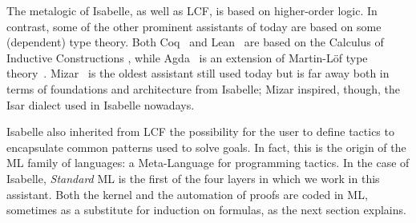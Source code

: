 The metalogic of Isabelle, as well as LCF, is based on higher-order logic.
In contrast, some of the other prominent assistants of today are
based on some (dependent) type theory. Both Coq~\cite{coq} and
Lean~\cite{DBLP:conf/cade/Moura021} are based on the Calculus of
Inductive Constructions
\cite{DBLP:conf/mfps/PfenningP89,DBLP:journals/iandc/CoquandH88},
while Agda~\cite{agda} is an extension of Martin-Löf type
theory~\cite{DBLP:books/daglib/0000395}. Mizar~\cite{mizar} is the
oldest assistant still used today but is far away both in terms of
foundations and architecture from Isabelle; Mizar inspired, though, the
Isar \cite{DBLP:conf/tphol/Wenzel99} dialect used in Isabelle nowadays.



Isabelle also inherited from LCF the possibility for the user to define
tactics to encapsulate common patterns used to solve goals. In
fact, this is the origin of the ML family of languages: a
Meta-Language for programming tactics.
In the case of Isabelle, \emph{Standard} ML is the first of the four layers
in which we work in this assistant. Both the kernel and the automation
of proofs are coded in ML, sometimes as a substitute for induction on
formulas, as the next section explains.

